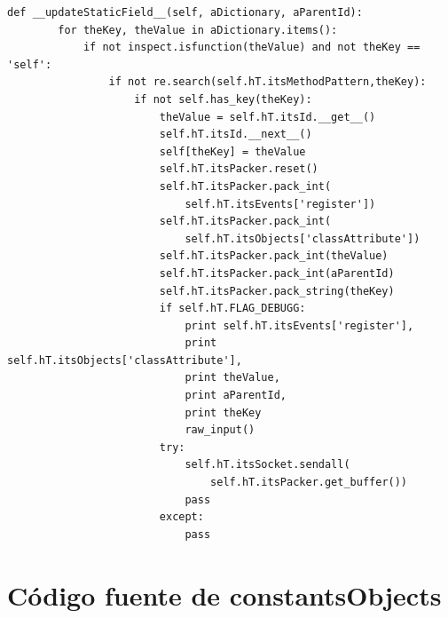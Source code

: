 \documentclass[12pt,legalpaper]{report}
\begin{document}
\begin{singlespace}
\begin{lstlisting}[style=Python]
    def __updateStaticField__(self, aDictionary, aParentId): 
        for theKey, theValue in aDictionary.items():
            if not inspect.isfunction(theValue) and not theKey == 'self':
                if not re.search(self.hT.itsMethodPattern,theKey):
                    if not self.has_key(theKey):
                        theValue = self.hT.itsId.__get__()
                        self.hT.itsId.__next__()
                        self[theKey] = theValue
                        self.hT.itsPacker.reset()
                        self.hT.itsPacker.pack_int(
                            self.hT.itsEvents['register'])
                        self.hT.itsPacker.pack_int(
                            self.hT.itsObjects['classAttribute'])
                        self.hT.itsPacker.pack_int(theValue)
                        self.hT.itsPacker.pack_int(aParentId)
                        self.hT.itsPacker.pack_string(theKey)
                        if self.hT.FLAG_DEBUGG:
                            print self.hT.itsEvents['register'],
                            print self.hT.itsObjects['classAttribute'],
                            print theValue,
                            print aParentId,
                            print theKey 
                            raw_input()                          
                        try:       
                            self.hT.itsSocket.sendall(
                                self.hT.itsPacker.get_buffer())
                            pass
                        except:
                            pass
\end{lstlisting}
\end{singlespace}

	\section{Código fuente de constantsObjects}
\end{document}
